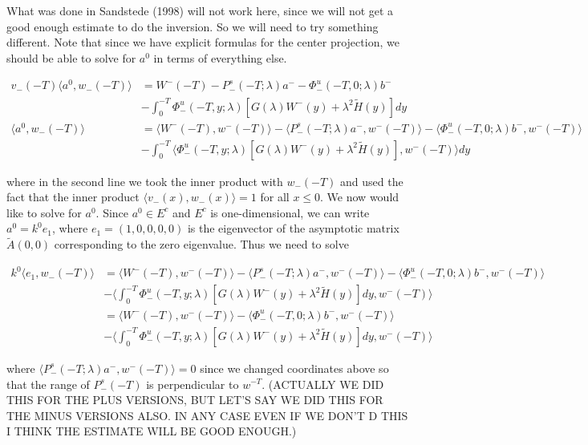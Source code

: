 \documentclass[12pt]{article}
\begin{document}
\begin{enumerate}
What was done in Sandstede (1998) will not work here, since we will not get a good enough estimate to do the inversion. So we will need to try something different. Note that since we have explicit formulas for the center projection, we should be able to solve for $a^0$ in terms of everything else.

\begin{align*}
v_-(-T) \langle a^0, w_-(-T) \rangle &= W^-(-T) - P^s_-(-T; \lambda)a^- - \Phi^u_-(-T, 0; \lambda)b^- \\
&-  \int_0^{-T} \Phi^u_-(-T, y; \lambda)[ G(\lambda)W^-(y) + \lambda^2 \tilde{H}(y) ] dy \\
\langle a^0, w_-(-T) \rangle &= \langle W^-(-T), w^-(-T) \rangle - \langle  P^s_-(-T; \lambda)a^-, w^-(-T) \rangle  - \langle \Phi^u_-(-T, 0; \lambda)b^-, w^-(-T) \rangle  \\
&- \int_0^{-T} \langle \Phi^u_-(-T, y; \lambda)[ G(\lambda)W^-(y) + \lambda^2 \tilde{H}(y) ], w^-(-T) \rangle  dy 
\end{align*}

where in the second line we took the inner product with $w_-(-T)$ and used the fact that the inner product $\langle v_-(x), w_-(x) \rangle = 1$ for all $x \leq 0$. We now would like to solve for $a^0$. Since $a^0 \in E^c$ and $E^c$ is one-dimensional, we can write $a^0 = k^0 e_1$, where $e_1 = (1, 0, 0, 0, 0)$ is the eigenvector of the asymptotic matrix $\tilde{A}(0, 0)$ corresponding to the zero eigenvalue. Thus we need to solve 

\begin{align*}
k^0 \langle e_1, w_-(-T) \rangle &= \langle W^-(-T), w^-(-T) \rangle - \langle  P^s_-(-T; \lambda)a^-, w^-(-T) \rangle  - \langle \Phi^u_-(-T, 0; \lambda)b^-, w^-(-T) \rangle  \\
&- \langle \int_0^{-T} \Phi^u_-(-T, y; \lambda)[ G(\lambda)W^-(y) + \lambda^2 \tilde{H}(y) ] dy, w^-(-T) \rangle \\
&= \langle W^-(-T), w^-(-T) \rangle - \langle \Phi^u_-(-T, 0; \lambda)b^-, w^-(-T) \rangle  \\
&- \langle \int_0^{-T} \Phi^u_-(-T, y; \lambda)[ G(\lambda)W^-(y) + \lambda^2 \tilde{H}(y) ] dy, w^-(-T) \rangle  
\end{align*}

where $\langle P^s_-(-T; \lambda)a^-, w^-(-T) \rangle = 0 $ since we changed coordinates above so that the range of $P^s_-(-T)$ is perpendicular to $w^{-T}$. (ACTUALLY WE DID THIS FOR THE PLUS VERSIONS, BUT LET'S SAY WE DID THIS FOR THE MINUS VERSIONS ALSO. IN ANY CASE EVEN IF WE DON'T D THIS I THINK THE ESTIMATE WILL BE GOOD ENOUGH.)\\


\end{enumerate}
\end{document}
